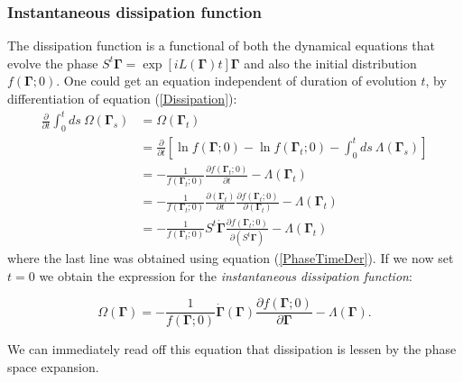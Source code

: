 \documentclass[a4paper,12pt]{article}
\begin{document}

\subsubsection{Instantaneous dissipation function}

The dissipation function is a functional of both the dynamical equations that evolve the phase $S^t \bm{\Gamma} = \exp[iL(\bm{\Gamma})t]\bm{\Gamma}$ and also the initial distribution $f(\bm{\Gamma};0)$.
One could get an equation independent of duration of evolution $t$, by differentiation of equation (\ref{Dissipation}):
\begin{equation}
\begin{aligned}
  \frac{\partial}{\partial t}\int_0^t ds\ \Omega(\bm{\Gamma}_s) &= \Omega(\bm{\Gamma}_t)\\
  &=\frac{\partial}{\partial t}[\ln{f(\bm{\Gamma};0)}-\ln{f(\bm{\Gamma}_t;0)}
-\int_0^t ds \ \Lambda(\bm{\Gamma}_s)
]\\
&=-\frac{1}{f(\bm{\Gamma}_t;0)}\frac{\partial f(\bm{\Gamma}_t;0)}{\partial t}-\Lambda( \bm{\Gamma}_t)\\
&=-\frac{1}{f(\bm{\Gamma}_t;0)}\frac{\partial(  \bm{\Gamma}_t)}{\partial t}\frac{\partial f(\bm{\Gamma}_t;0)}{\partial(\bm{\Gamma}_t)}-\Lambda(\bm{\Gamma}_t)\\
&=-\frac{1}{f(\bm{\Gamma}_t;0)}S^t\dot{\bm{\Gamma}}
\frac{\partial f(\bm{\Gamma}_t;0)}{\partial(S^t \bm{\Gamma})}-\Lambda( \bm{\Gamma}_t)
\end{aligned}
\end{equation}
where the last line was obtained using equation (\ref{PhaseTimeDer}). 
If we now set $t=0$ we obtain the expression for the \textit{instantaneous dissipation function}:

\begin{equation}
  \Omega(\bm{\Gamma})=-\frac{1}{f(\bm{\Gamma};0)}\dot{\bm{\Gamma}}(\bm{\Gamma})\frac{\partial{f(\bm{\Gamma};0)}}{\partial{\bm{\Gamma}}}-\Lambda(\bm{\Gamma}).
\end{equation}

We can immediately read off this equation that dissipation is lessen by the phase space expansion. 

\end{document}
